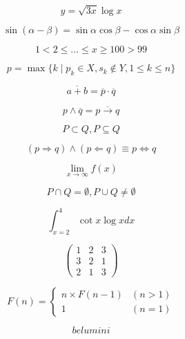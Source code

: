 \documentclass[a4j,twocolumn]{jarticle}
\begin{document}
\begin{equation}
y = \sqrt{3x}\log x
\end{equation}

\begin{equation}
\sin(\alpha - \beta) = \sin\alpha\cos\beta - \cos\alpha\sin\beta
\end{equation}

\begin{equation}
1 < 2 \leq \dots \leq x \geq 100 > 99
\end{equation}

\begin{equation}
p = \max \{ k \mid p_k \in X, s_k \notin Y, 1 \leq k \leq n \}
\end{equation}

\begin{equation}
\overline{a+b} = \overline{p} \cdot \overline{q}
\end{equation}

\begin{equation}
p \land \overline{q} = \overline{p \to q}
\end{equation}

\begin{equation}
P \subset Q, P \subseteq Q
\end{equation}

\begin{equation}
(p \Rightarrow q) \land (p \Leftarrow q) \equiv p \Leftrightarrow q
\end{equation}

\begin{equation}
\lim_{x \to \infty}f(x)
\end{equation}

\begin{equation}
P \cap Q = \emptyset, P \cup Q \neq \emptyset
\end{equation}

\begin{equation}
\int_{x=2}^4 \cot x \log x dx
\end{equation}

\begin{equation}
    \begin{pmatrix}
        1 & 2 & 3\\
        3 & 2 & 1\\
        2 & 1 & 3
    \end{pmatrix}
\end{equation}

\begin{equation}
    F(n) = 
    \begin{cases}
        n \times F(n-1) & (n>1)\\
        1 & (n=1)
    \end{cases}
\end{equation}

\begin{equation}
    belum ini
\end{equation}
\end{document}

